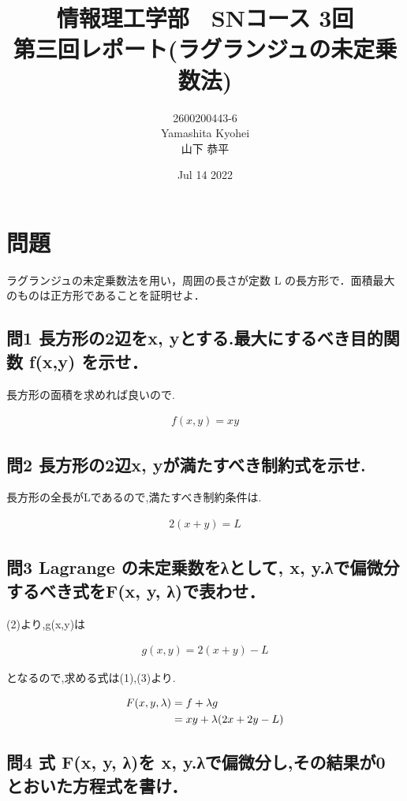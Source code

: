\documentclass[dvipdfmx,autodetect-engine,titlepage]{jsarticle}
\title{情報理工学部　SNコース 3回\\
第三回レポート(ラグランジュの未定乗数法)\\}
\author{2600200443-6\\Yamashita Kyohei\\山下 恭平}
\date{Jul 14 2022}
\begin{document}
\maketitle

\section*{問題}

ラグランジュの未定乗数法を用い，周囲の長さが定数 L の長方形で．面積最大
のものは正方形であることを証明せよ．

\subsection*{問1 長方形の2辺をx, yとする.最大にするべき目的関数 f(x,y) を示せ．}

長方形の面積を求めれば良いので.

\begin{align}
  f(x,y) = xy
\end{align}

\subsection*{問2 長方形の2辺x, yが満たすべき制約式を示せ.}

長方形の全長がLであるので,満たすべき制約条件は.

\begin{align}
  2(x+y) = L
\end{align}

\subsection*{問3 Lagrange の未定乗数をλとして, x, y.λで偏微分するべき式をF(x, y, λ)で表わせ．}

(2)より,g(x,y)は

\begin{align}
  g(x,y) = 2(x+y) - L
\end{align}

となるので,求める式は(1),(3)より.

\begin{align}
  F(x,y,\lambda) &= f + \lambda g \notag\\
  &= xy + \lambda(2x+2y-L)
\end{align}

\subsection*{問4 式 F(x, y, λ)を x, y.λで偏微分し,その結果が0 とおいた方程式を書け．}
\end{document}
